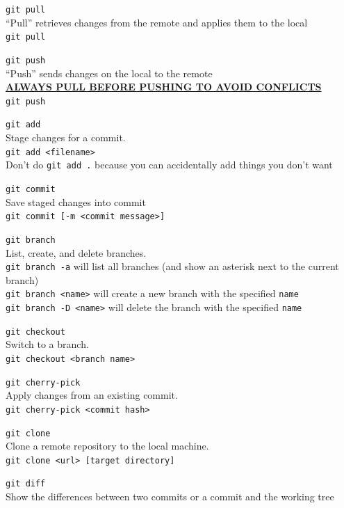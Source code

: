 \documentclass{article}
\begin{document}
\begin{description}
	\item \texttt{git pull}
		\\``Pull'' retrieves changes from the remote and applies them to the local
		\\\texttt{git pull}
	\item \texttt{git push}
		\\``Push'' sends changes on the local to the remote
		\\\underline{\textbf{ALWAYS PULL BEFORE PUSHING TO AVOID CONFLICTS}}
		\\\texttt{git push}
	\item \texttt{git add}
		\\Stage changes for a commit.
		\\\texttt{git add <filename>}
		\\Don't do \texttt{git add .} because you can accidentally add things you don't want
	\item \texttt{git commit}
		\\Save staged changes into commit
		\\\texttt{git commit [-m <commit message>]}
	\item \texttt{git branch}
		\\List, create, and delete branches.
		\\\texttt{git branch -a} will list all branches (and show an asterisk next to the current branch)
		\\\texttt{git branch <name>} will create a new branch with the specified \texttt{name}
		\\\texttt{git branch -D <name>} will delete the branch with the specified \texttt{name}
	\item \texttt{git checkout}
		\\Switch to a branch.
		\\\texttt{git checkout <branch name>}
	\item \texttt{git cherry-pick}
		\\Apply changes from an existing commit.
		\\\texttt{git cherry-pick <commit hash>}
	\item \texttt{git clone}
		\\Clone a remote repository to the local machine.
		\\\texttt{git clone <url> [target directory]}
	\item \texttt{git diff}
		\\Show the differences between two commits or a commit and the working tree

\end{description}
\end{document}
